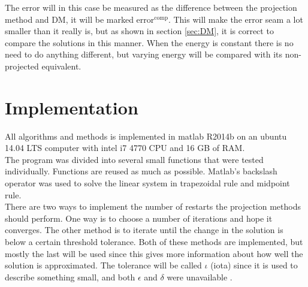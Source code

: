 The error will in this case be measured as the difference between the projection method and DM, it will be marked $\text{error}^{\text{comp}}$. This will make the error seam a lot smaller than it really is, but as shown in section \ref{sec:DM}, it is correct to compare the solutions in this manner. When the energy is constant there is no need to do anything different, but varying energy will be compared with its non-projected equivalent.

\section{Implementation} %
\label{sec:praktisk}
All algorithms and methods is implemented in matlab R2014b on an ubuntu 14.04 LTS computer with intel i7 4770 CPU and 16 GB of RAM. \\
The program was divided into several small functions that were tested individually. Functions are reused as much as possible.
Matlab's backslash operator was used to solve the linear system in trapezoidal rule and midpoint rule. \\

There are two ways to implement the number of restarts the projection methods should perform. One way is to choose a number of iterations and hope it converges. The other method is to iterate until the change in the solution is below a certain threshold tolerance. Both of these methods are implemented, but mostly the last will be used since this gives more information about how well the solution is approximated. The tolerance will be called $\iota$ (iota) since it is used to describe something small, and both $\epsilon$ and $\delta$ were unavailable \cite{iota}.
